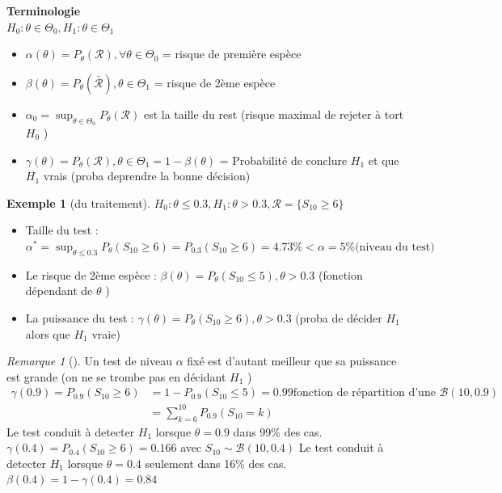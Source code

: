 \documentclass{article}
\theoremstyle{plain}%
\theoremstyle{definition}
\newtheorem{exmp}{Exemple}[section]
\theoremstyle{remark}
\newtheorem*{rem}{Remarque}
\begin{document}
    \textbf{Terminologie} \\
    $ H_0: \theta \in \Theta _0, H_1: \theta \in \Theta _1 $ 
    \begin{itemize}
        \item $ \alpha (\theta ) = P_\theta (\mathcal{R}), \forall \theta \in \Theta _0 $ = risque de première espèce 
        \item $ \beta (\theta ) = P_\theta (\bar{\mathcal{R}}), \theta \in \Theta _1 $ = risque de 2ème espèce
        \item $ \alpha _0 = \sup _{\theta \in \Theta _0} P_\theta (\mathcal{R})$ est la taille du rest (risque maximal de rejeter à tort $ H_0 $ )
        \item $ \gamma (\theta ) = P_\theta (\mathcal{R}), \theta \in \Theta _1 = 1 - \beta (\theta ) $  = Probabilité de conclure $ H_1 $ et que $ H_1 $ vrais (proba deprendre la bonne décision)
    \end{itemize}

    \begin{exmp}[du traitement]
        $ H_0: \theta \leq 0.3, H_1: \theta > 0.3, \mathcal{R}= \{S_{10} \geq 6\} $ \\\begin{itemize}
            \item Taille du test : $ \alpha ^* = \sup _{\theta \leq 0.3} P_\theta (S_{10} \geq 6) = P_{0.3} (S_{10} \geq 6) = 4.73\% < \alpha =5\% \text{(niveau du test)} $ 
            \item Le risque de 2ème espèce : $ \beta (\theta ) = P_\theta (S_{10} \leq 5), \theta > 0.3 $  (fonction dépendant de $ \theta  $ )
            \item La puissance du test : $ \gamma (\theta ) = P_\theta (S_{10} \geq 6), \theta > 0.3 $ (proba de décider $ H_1 $ alors que $ H_1 $ vraie)
        \end{itemize}
    \end{exmp}

    \begin{rem}[]
        Un test de niveau $ \alpha  $ fixé est d'autant meilleur que sa puissance est grande (on ne se trombe pas en décidant $ H_1 $ )
        \begin{align*}
            \gamma (0.9) = P_{0.9} (S_{10} \geq 6) &= 1-P_{0.9}(S_{10} \leq 5) = 0.99 \text{fonction de répartition d'une } \mathcal{B}(10,0.9)\\
            &= \sum_{k=6}^{10}P_{0.9} (S_{10} = k)
        \end{align*}
        Le test conduit à detecter $ H_1 $ lorsque $ \theta =0.9 $ dans 99\% des cas. \\
        $ \gamma (0.4) = P_{0.4}(S_{10} \geq 6) = 0.166$ avec $ S_{10} \sim \mathcal{B}(10,0.4) $ Le test conduit à detecter $ H_1 $ lorsque $ \theta =0.4 $ seulement dans 16\% des cas. $ \beta (0.4) = 1-\gamma (0.4) = 0.84 $ 
    \end{rem}
    
\end{document}
